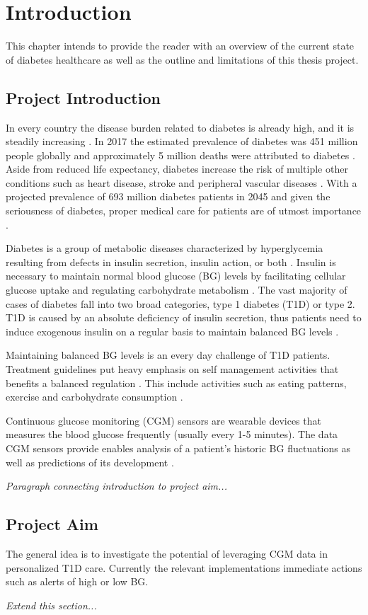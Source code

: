 \chapter{Introduction}

This chapter intends to provide the reader with an overview of the current state of diabetes healthcare as well as the outline and limitations of this thesis project.

\section{Project Introduction}

In every country the disease burden related to diabetes is already high, and it is steadily increasing \parencite{Forouhi2014}.
In 2017 the estimated prevalence of diabetes was 451 million people globally and approximately 5 million deaths were attributed to diabetes \parencite{Cho2018}.
Aside from reduced life expectancy, diabetes increase the risk of multiple other conditions such as heart disease, stroke and peripheral vascular diseases \parencite{Forouhi2014}.
With a projected prevalence of 693 million diabetes patients in 2045 and given the seriousness of diabetes, proper medical care for patients are of utmost importance \parencite{Cho2018}.

Diabetes is a group of metabolic diseases characterized by hyperglycemia resulting from defects in insulin secretion, insulin action, or both \parencite{ADA2010}.
Insulin is necessary to maintain normal blood glucose (BG) levels by facilitating cellular glucose uptake and regulating carbohydrate metabolism \parencite{Wilcox2005}.
The vast majority of cases of diabetes fall into two broad categories, type 1 diabetes (T1D) or type 2.
T1D is caused by an absolute deficiency of insulin secretion, thus
patients need to induce exogenous insulin on a regular basis to maintain balanced BG levels \parencite{ADA2010}.

Maintaining balanced BG levels is an every day challenge of T1D patients.
Treatment guidelines put heavy emphasis on self management activities that benefits a balanced regulation \parencite{Cooke2013}.
This include activities such as eating patterns, exercise and carbohydrate consumption \parencite{Cooke2013}.

Continuous glucose monitoring (CGM) sensors are wearable devices that measures the blood glucose frequently (usually every 1-5 minutes).
The data CGM sensors provide enables analysis of a patient's historic BG fluctuations as well as predictions of its development \parencite{Facchinetti2016}.

\textit{Paragraph connecting introduction to project aim...}

\section{Project Aim}

The general idea is to investigate the potential of leveraging CGM data in personalized T1D care.
Currently the relevant implementations immediate actions such as alerts of high or low BG.

\textit{Extend this section...}
